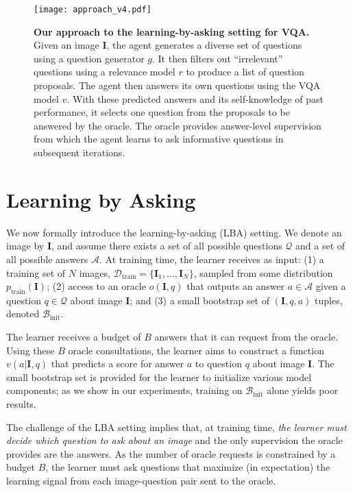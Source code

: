 \documentclass[10pt,twocolumn,letterpaper]{article}
\newcommand{\image}{\mathbf{I}}
\newcommand{\imageQApair}{(\mathbf{I}, q, a)}
\newcommand{\bootstrap}{\mathcal{B}_{\mathrm{init}}}
\newcommand{\trainset}{\mathcal{D}_\mathrm{train}}
\begin{document}
\begin{figure*}[!t]
    \centering
    \texttt{[image: approach\_v4.pdf]}
    \vspace{-0.2in}
    \caption{\textbf{Our approach to the learning-by-asking setting for VQA.} Given an image $\image$, the agent generates a diverse set of questions using a question generator $g$. It then filters out ``irrelevant'' questions using a relevance model $r$ to produce a list of question proposals. The agent then answers its own questions using the VQA model $v$. With these predicted answers and its self-knowledge of past performance, it selects one question from the proposals to be answered by the oracle. The oracle provides answer-level supervision from which the agent learns to ask informative questions in subsequent iterations.}
    \vspace{-0.15in}
    \label{fig:approach}
\end{figure*}

\section{Learning by Asking}

We now formally introduce the learning-by-asking (LBA) setting. We denote an image by $\image$, and assume there exists a set of all possible questions $\mathcal{Q}$ and a set of all possible answers $\mathcal{A}$. At training time, the learner receives as input: (1) a training set of $N$ images, $\trainset \!=\! \{\image_1, \dots, \image_N\}$, sampled from some distribution $p_\mathrm{train}(\image)$; (2) access to an oracle $o(\image, q)$ that outputs an answer $a \in \mathcal{A}$ given a question $q \in \mathcal{Q}$ about image $\image$; and (3) a small bootstrap set of $\imageQApair$ tuples, denoted $\bootstrap$.

The learner receives a budget of $B$ answers that it can request from the oracle. Using these $B$ oracle consultations, the learner aims to construct a function $v(a | \image, q)$ that predicts a score for answer $a$ to question $q$ about image $\image$. The small bootstrap set is provided for the learner to initialize various model components; as we show in our experiments, training on $\bootstrap$ alone yields poor results. 

The challenge of the LBA setting implies that, at training time, \emph{the learner must decide which question to ask about an image} and the only supervision the oracle provides are the answers. As the number of oracle requests is constrained by a budget $B$, the learner must ask questions that maximize (in expectation) the learning signal from each image-question pair sent to the oracle.
\end{document}
